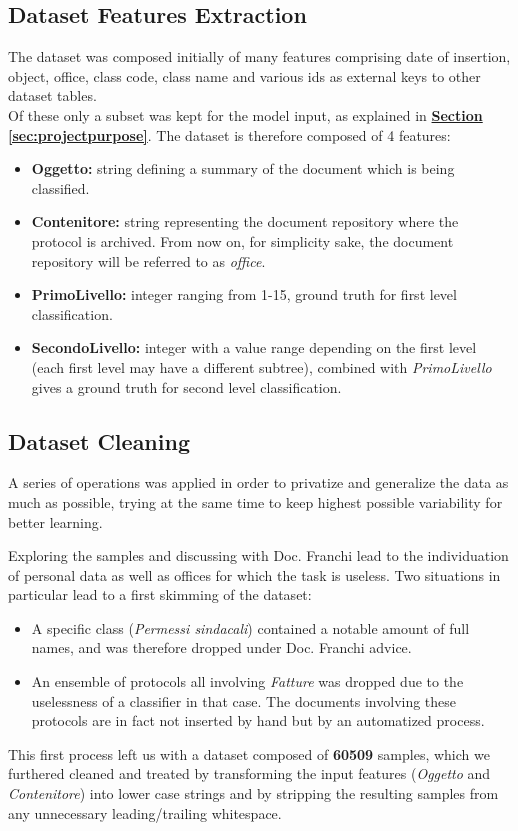 \documentclass[12pt]{article}
\begin{document}
\subsection{Dataset Features Extraction}
The dataset was composed initially of many features comprising date of insertion, object, office, class code, class name and various ids as external keys to other dataset tables.\\Of these only a subset was kept for the model input, as explained in \hyperref[sec:projectpurpose]{\textbf{Section \ref{sec:projectpurpose}}}. The dataset is therefore composed of 4 features:
\begin{itemize}
    \item \textbf{Oggetto:} string defining a summary of the document which is being classified.
    \item \textbf{Contenitore:} string representing the document repository where the protocol is archived. From now on, for simplicity sake, the document repository will be referred to as \textit{office}.
    \item \textbf{PrimoLivello:} integer ranging from 1-15, ground truth for first level classification.
    \item \textbf{SecondoLivello:} integer with a value range depending on the first level (each first level may have a different subtree), combined with \textit{PrimoLivello} gives a ground truth for second level classification.
\end{itemize}

\subsection{Dataset Cleaning}
A series of operations was applied in order to privatize and generalize the data as much as possible, trying at the same time to keep highest possible variability for better learning.

Exploring the samples and discussing with Doc. Franchi lead to the individuation of personal data as well as offices for which the task is useless. Two situations in particular lead to a first skimming of the dataset:
\begin{itemize}
    \item A specific class (\textit{Permessi sindacali}) contained a notable amount of full names, and was therefore dropped under Doc. Franchi advice. 
    \item An ensemble of protocols all involving \textit{Fatture} was dropped due to the uselessness of a classifier in that case. The documents involving these protocols are in fact not inserted by hand but by an automatized process.
\end{itemize}
This first process left us with a dataset composed of \textbf{60509} samples, which we furthered cleaned and treated by transforming the input features (\textit{Oggetto} and \textit{Contenitore}) into lower case strings and by stripping the resulting samples from any unnecessary leading/trailing whitespace. 
\end{document}
